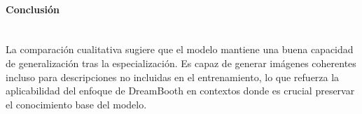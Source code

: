 \paragraph{\textbf{Conclusión}} \mbox{}\\[0.5em]
La comparación cualitativa sugiere que el modelo mantiene una buena capacidad de generalización tras la especialización. Es capaz de generar imágenes coherentes incluso para descripciones no incluidas en el entrenamiento, lo que refuerza la aplicabilidad del enfoque de DreamBooth en contextos donde es crucial preservar el conocimiento base del modelo.
